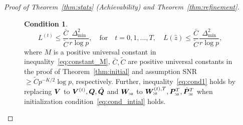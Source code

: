 \documentclass[journal]{IEEEtran}
\theoremstyle{definition}
\theoremstyle{definition}
\newtheorem{condition}{Condition}
\newcommand{\of}[1]{\left(#1\right)}
\newcounter{MYtempeqncnt}
\begin{document}
\begin{proof}[Proof of Theorem~\ref{thm:stats} (Achievability) and Theorem~\ref{thm:refinement}]
{\begin{figure}[t]
\begin{condition}
\begin{equation}\label{eq:cond_intial}
    L^{(t)} \leq \frac{\bar C}{\tilde C} \frac{\Delta_{\min}^2}{r \log p}, \quad \text{for} \quad t = 0, 1, \ldots, T, \quad  L(\hat z) \leq \frac{\bar C}{\tilde C} \frac{\Delta_{\min}^2}{r \log p},
\end{equation}
where $M$ is a positive universal constant in inequality~\eqref{eq:constant_M}, $\bar C, \tilde C$ are positive universal constants in {the proof of Theorem~\ref{thm:initial}} and assumption SNR $\geq \tilde C p^{-K/2} \log p$, respectively. Further, inequality~\eqref{eq:cond1} holds by replacing $\bm{V}$ to $\bm{V}^{(t)}, \bm{Q}, \hat {\bm{Q}}$ and $\bm{W}_{:a}$ to $\bm{W}_{:a}^{(t),T}, \bm{P}_{:a}^T, \hat {\bm{P}}_{:a}^T$ when initialization condition~\eqref{eq:cond_intial} holds.
\end{condition}
\setcounter{equation}{\value{MYtempeqncnt}} 
\hrulefill 
\vspace*{4pt} 
\end{figure}
\setcounter{equation}{66} 




}
\end{proof}
\end{document}
